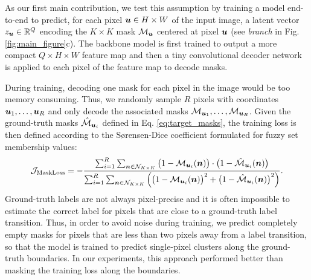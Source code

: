 As our first main contribution, we test this assumption by training a model end-to-end to predict, for each pixel $\bm{u}\in H\times W$ of the input image, a latent vector $z_{\bm{u}}\in \mathbb{R}^Q$ encoding the $K \times K$ \maskname mask $\mathcal{M}_{\bm{u}}$ centered at pixel $\bm{u}$ (see \emph{\encBr branch} in Fig. \ref{fig:main_figure}c). 
The backbone model is first trained to output a more compact $Q\times H\times W$ feature map and
then a tiny convolutional decoder network is applied to each pixel of the feature map to decode masks.

During training, decoding one mask for each pixel in the image would be too memory consuming. Thus, we randomly sample $R$ pixels with coordinates $\bm{u}_1, \ldots, \bm{u}_R$ and only decode the associated masks $\mathcal{M}_{\bm{u}_1}, \ldots, \mathcal{M}_{\bm{u}_R}$. 
Given the ground-truth \maskname masks $\hat{\mathcal{M}}_{\bm{u}_i}$ defined in Eq. \ref{eq:target_masks}, the training loss is then defined according to the S\o rensen-Dice coefficient formulated for fuzzy set membership values:
\begin{equation}
\mathcal{J}_{\mathrm{MaskLoss}} = - \frac{\sum_{i=1}^R \sum_{\bm{n} \in \mathcal{N}_{K\times K}} \big(1-\mathcal{M}_{\bm{u}_i}(\bm{n})\big)\cdot \big(1-\hat{\mathcal{M}}_{\bm{u}_i}(\bm{n})\big)}{\sum_{i=1}^R \sum_{\bm{n}\in \mathcal{N}_{K\times K}} \Big( \big(1-\mathcal{M}_{\bm{u}_i}(\bm{n})\big)^2 + \big(1-\hat{\mathcal{M}}_{\bm{u}_i}(\bm{n})\big)^2 \Big)}.
\end{equation} 
Ground-truth labels are not always pixel-precise and it is often impossible to estimate the correct label for pixels that are close to a ground-truth label transition. Thus, in order to avoid noise during training, we predict completely empty masks for pixels that are less than two pixels away from a label transition, so that the model is trained to predict single-pixel clusters along the ground-truth boundaries. In our experiments, this approach performed better than masking the training loss along the boundaries.


